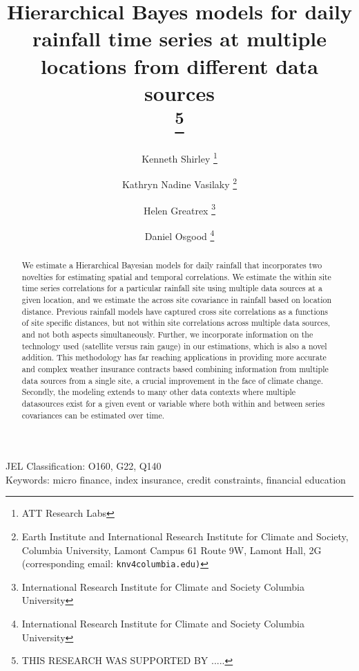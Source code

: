 \documentclass[12pt]{article}
\begin{document}
\title{Hierarchical Bayes models for daily rainfall time series at multiple locations from different data sources\\
\thanks{THIS RESEARCH WAS SUPPORTED BY .....}
}
\author {Kenneth Shirley \thanks{ATT Research Labs}
\and Kathryn Nadine Vasilaky \thanks{Earth Institute and International Research Institute for Climate and Society, Columbia University, Lamont Campus 61 Route 9W, Lamont Hall, 2G (corresponding email: \tt{knv4columbia.edu})}
\and Helen Greatrex  \thanks{International Research Institute for Climate and Society Columbia University}
\and Daniel Osgood \thanks{International Research Institute for Climate and Society Columbia University}}
\maketitle

\vspace{-4ex}

\begin{singlespace}  
\begin{abstract}
We estimate a Hierarchical Bayesian models for daily rainfall that incorporates two novelties for estimating spatial and temporal correlations. We estimate the within site time series correlations for a particular rainfall site using multiple data sources at a given location, and we estimate the across site covariance in rainfall based on location distance. Previous rainfall models have captured cross site correlations as a functions of site specific distances, but not within site correlations across multiple data sources, and not both aspects simultaneously. Further, we incorporate information on the technology used (satellite versus rain gauge) in our estimations, which is also a novel addition. This methodology has far reaching applications in providing more accurate and complex weather insurance contracts based combining information from multiple data sources from a  single site,  a crucial improvement in the face of climate change. Secondly, the modeling extends to many other data contexts where multiple datasources exist for a given event or variable where both within and between series covariances can be estimated over time.
\end{abstract}


\thispagestyle{empty}
\noindent JEL Classification: O160, G22, Q140\\
\noindent Keywords: micro finance, index insurance, credit constraints, financial education 
\end{singlespace}
 
\end{document}
